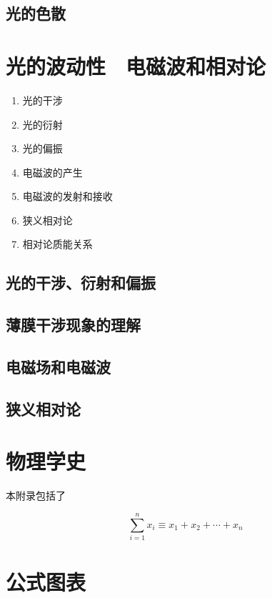 \documentclass[cn,11pt,mac, simple]{elegantbook}
\begin{document}
\clearpage\section{光的色散}

\chapter{光的波动性　电磁波和相对论}
\begin{enumerate}
   \item 光的干涉
   \item 光的衍射
   \item 光的偏振
   \item 电磁波的产生
   \item 电磁波的发射和接收
   \item 狭义相对论
   \item 相对论质能关系
\end{enumerate}

\clearpage\section{光的干涉、衍射和偏振}

\clearpage\section{薄膜干涉现象的理解}

\clearpage\section{电磁场和电磁波}

\clearpage\section{狭义相对论}



\nocite{*} 

\printbibliography[heading=bibintoc, title=\ebibname]

\appendix
\chapter{物理学史}

本附录包括了

\begin{equation}
\sum_{i=1}^n x_i \equiv x_1 + x_2 +\cdots + x_n
\end{equation}



\chapter{公式图表}
\end{document}
